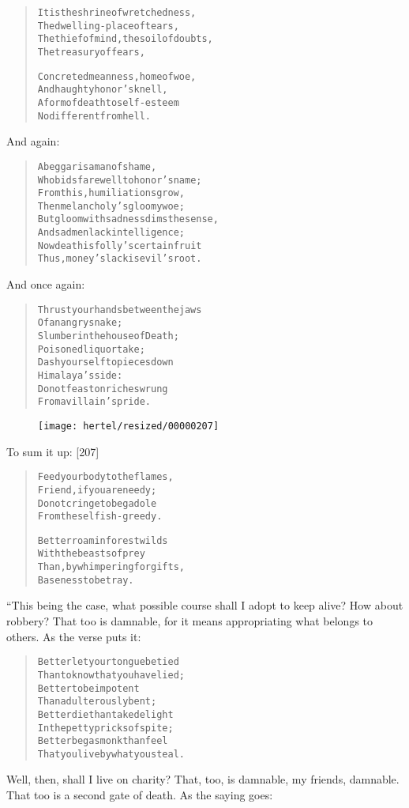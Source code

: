 \documentclass[article, twoside, 10pt]{memoir}
\renewenvironment{verbatim}{%
\begin{quote}%
\vskip -10pt%
\begin{alltt}\normalfont\small}{\end{alltt}%
\end{quote}%
\vskip -10pt
} %
\begin{document}
\begin{verbatim}
It is the shrine of wretchedness,
    The dwelling-place of tears,
The thief of mind, the soil of doubts,
    The treasury of fears,

Concreted meanness, home of woe,
    And haughty honor's knell,
A form of death{\textemdash}to self-esteem
    No different from hell.
\end{verbatim}
And again:

\begin{verbatim}
A beggar is a man of shame,
Who bids farewell to honor's name;
From this, humiliations grow,
Then melancholy's gloomy woe;
But gloom with sadness dims the sense,
And sad men lack intelligence;
Now death is folly's certain fruit{\textemdash}
Thus, money's lack is evil's root.
\end{verbatim}
And once again:

\begin{verbatim}
Thrust your hands between the jaws
    Of an angry snake;
Slumber in the house of Death;
    Poisoned liquor take;
Dash yourself to pieces down
    Himalaya's side:
Do not feast on riches wrung
    From a villain's pride.
\end{verbatim}
\begin{figure}[p]\texttt{[image: hertel/resized/00000207]}\end{figure}To sum it up: [207]

\begin{verbatim}
Feed your body to the flames,
    Friend, if you are needy;
Do not cringe to beg a dole
    From the selfish-greedy.

Better roam in forest wilds
With the beasts of prey
Than, by whimpering for gifts,
Baseness to betray.
\end{verbatim}
“This being the case, what possible course shall I adopt to keep
alive? How about robbery? That too is damnable, for it means
appropriating what belongs to others. As the verse puts it:

\begin{verbatim}
Better let your tongue be tied
Than to know that you have lied;
Better to be impotent
Than adulterously bent;
Better die than take delight
In the petty pricks of spite;
Better beg as monk than feel
That you live by what you steal.
\end{verbatim}
Well, then, shall I live on charity? That, too, is damnable, my
friends, damnable. That too is a second gate of death. As the
saying goes:
\end{document}
